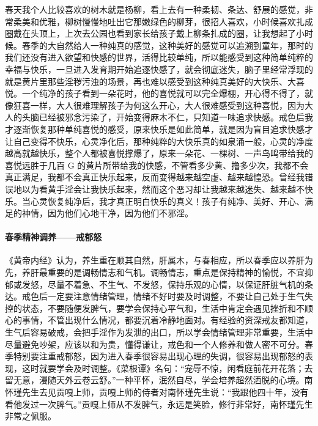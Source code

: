 春天我个人比较喜欢的树木就是杨柳，看上去有一种柔韧、条达、舒展的感觉，非常柔美和优雅，柳树慢慢地吐出它那嫩绿色的柳芽，很招人喜欢，小时候喜欢扎成圈戴在头顶上，上次去公园也看到家长给孩子戴上柳条扎成的圈，让我想起了小时候。春季的大自然给人一种纯真的感觉，这种美好的感觉可以追溯到童年，那时的我们还没有进入欲望和快感的世界，活得比较单纯，所以能感受到这种简单纯粹的幸福与快乐，一旦进入发育期开始追逐快感了，就会彻底迷失，脑子里经常浮现的就是黄片里那些淫秽污浊的场景，再也难以感受到这种纯真美好的大快乐、大喜悦。一个纯净的孩子看到一朵花时，他的喜悦就可以完全爆棚，开心得不得了，就像狂喜一样，大人很难理解孩子为何这么开心，大人很难感受到这种喜悦，因为大人的头脑已经被邪念污染了，开始变得麻木不仁，只知道一味追求快感。戒色后我才逐渐恢复那种单纯喜悦的感受，原来快乐是如此简单，就是因为盲目追求快感才让自己变得不快乐，心灵净化后，那种纯粹的大快乐真的如泉涌一般，心灵的净度越高就越快乐，整个人都被喜悦撑爆了，原来一朵花、一棵树、一声鸟鸣带给我的喜悦远胜于几百 G 的黄片所带给我的快感，不管看多少黄、撸多少次，我都不会真正满足，我都不会真正快乐起来，反而变得越来越空虚、越来越惶恐。曾经我错误地以为看黄手淫会让我快乐起来，然而这个恶习却让我越来越迷失、越来越不快乐。当心灵恢复纯净后，我才真正明白快乐的真义！孩子有纯净、美好、开心、满足的神情，因为他们心地干净，因为他们不邪淫。

\paragraph{春季精神调养——戒郁怒}

《黄帝内经》认为，养生重在顺其自然，肝属木，与春相应，所以春季应以养肝为先，养肝最重要的是调畅情志和气机。调畅情志，重点是保持精神的愉悦，不宜抑郁或发怒，尽量不着急、不生气、不发怒，保持乐观的心情，以保证肝脏气机的条达。戒色后一定要注意情绪管理，情绪不好时要及时调整，不要让自己处于生气失控的状态，不要随便发脾气，要学会保持心平气和，生活中肯定会遇见挫折和不顺心的事情，不管出现什么情况，都要沉着冷静地面对。有经验的资深戒友都知道，生气后容易破戒，会把手淫作为发泄的出口，所以学会情绪管理非常重要，生活中尽量避免吵架，应该以和为贵，懂得谦让，戒色和一个人修养和做人密不可分。春季特别要注重戒郁怒，因为进入春季很容易出现心理的失调，很容易出现郁怒的表现，这时就要学会及时调整。《菜根谭》名句：“宠辱不惊，闲看庭前花开花落；去留无意，漫随天外云卷云舒。”一种平怀，泯然自尽，学会培养超然洒脱的心境。南怀瑾先生去见贡嘎上师，贡嘎上师的侍者对南怀瑾先生说：“我跟他四十年，没有看他发过一次脾气。”贡嘎上师从不发脾气，永远是笑脸，修行非常好，南怀瑾先生非常之佩服。

